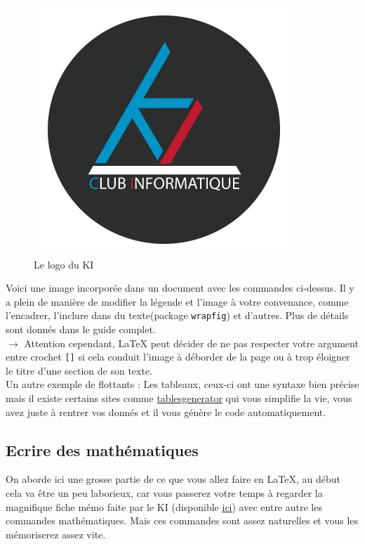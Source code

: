 \documentclass[11pt]{article}				%
\begin{document}
\begin{figure}[h!]
	\centering
	\includegraphics[scale=0.2]{ressources/KI.png}
	\caption{Le logo du KI}
\end{figure}



Voici une image incorporée dans un document avec les commandes ci-dessus. Il y a plein de manière de modifier la légende et l'image à votre convenance, comme l'encadrer, l'inclure dans du texte(package \texttt{wrapfig}) et d'autres. Plus de détails sont donnés dans le guide complet.\\


$\rightarrow$ Attention cependant, LaTeX peut décider de ne pas respecter votre argument entre crochet \texttt{[]} si cela conduit l'image à déborder de la page ou à trop éloigner le titre d'une section de son texte.\\

Un autre exemple de flottants : Les tableaux, ceux-ci ont une syntaxe bien précise mais il existe certains sites comme \href{https://www.tablesgenerator.com/}{tablesgenerator} qui vous simplifie la vie, vous avez juste à rentrer vos donnés et il vous génère le code automatiquement.


\subsection*{Ecrire des mathématiques}

On aborde ici une grosse partie de ce que vous allez faire en LaTeX, au début cela va être un peu laborieux, car vous passerez votre temps à regarder la magnifique fiche mémo faite par le KI (disponible \href{http://latex.enpc.org}{ici}) avec entre autre les commandes mathématiques. Mais ces commandes sont assez naturelles et vous les mémoriserez assez vite.\\
\end{document}
